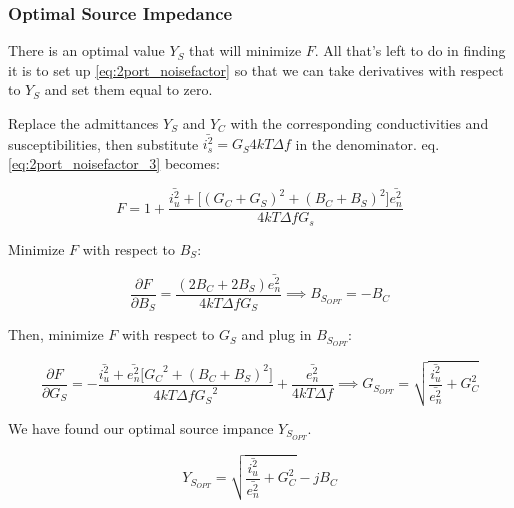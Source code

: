 \subsubsection{Optimal Source Impedance}
There is an optimal value $Y_S$ that will minimize $F$. All that's left to do in finding it is to set up
\ref{eq:2port_noisefactor} so that we can take derivatives with respect to $Y_S$ and set them equal to zero.

Replace the admittances $Y_S$ and $Y_C$ with the corresponding conductivities and susceptibilities, then substitute
$\bar{i_s^2} = G_S 4kT\Delta f$ in the denominator. eq. \ref{eq:2port_noisefactor_3} becomes:

\begin{equation}\label{eq:2port_noisefactor_4}
    F = 1 + \frac{\bar{i_u^2} + \big[(G_C+G_S)^2 + (B_C+B_S)^2\big] \bar{e_n^2}}{4kT \Delta f G_s}
\end{equation}

Minimize $F$ with respect to $B_S$:

\begin{equation}\label{eq:partial_B_S}
    \frac{\partial F}{\partial B_S} = \frac{(2 B_C + 2 B_S) \bar{e_n^2}}{4kT\Delta f G_S} \implies B_{S_{OPT}} = -B_C
\end{equation}

Then, minimize $F$ with respect to $G_S$ and plug in $B_{S_{OPT}}$:

\begin{equation}\label{eq:partial_G_S}
    \frac{\partial F}{\partial G_S} = -\frac{\bar{i_u^2} + \bar{e_n^2} \big[{G_C}^2 + (B_C+B_S)^2 \big]}{4kT\Delta f
    {G_S}^2} + \frac{\bar{e_n^2}}{4 kT\Delta f} \implies G_{S_{OPT}} = \sqrt{\frac{\bar{i_u^2}}{\bar{e_n^2}} + G_C^2}
\end{equation}

We have found our optimal source impance $Y_{S_{OPT}}$.

\begin{equation}\label{eq:y_opt}
    Y_{S_{OPT}} =  \sqrt{\frac{\bar{i_u^2}}{\bar{e_n^2}} + G_C^2} - j B_C
\end{equation}
